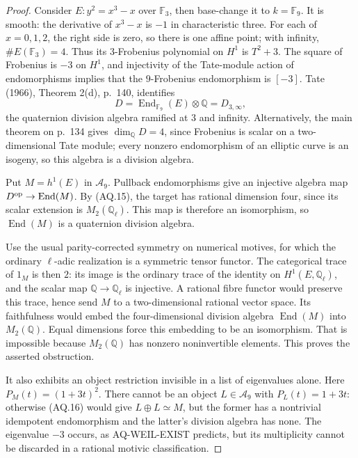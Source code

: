 \documentclass[11pt,a4paper]{article}
\theoremstyle{definition}\newtheorem{definition}[theorem]{Definition}
\theoremstyle{remark}\newtheorem{remark}[theorem]{Remark}
\begin{document}
\begin{proof}
Consider $E:y^2=x^3-x$ over $\mathbb F_3$, then
base-change it to $k=\mathbb F_9$. It is smooth:
the derivative of $x^3-x$ is $-1$ in characteristic
three. For each of $x=0,1,2$, the right side is
zero, so there is one affine point; with infinity,
$\#E(\mathbb F_3)=4$. Thus its $3$-Frobenius
polynomial on $H^1$ is $T^2+3$. The square of
Frobenius is $-3$ on $H^1$, and injectivity of
the Tate-module action of endomorphisms implies
that the $9$-Frobenius endomorphism is $[-3]$.
Tate (1966), Theorem 2(d), p.~140, identifies
\[
 D=\operatorname{End}_{\mathbb F_9}(E)\otimes\mathbb Q
   =D_{3,\infty},
\]
the quaternion division algebra ramified at $3$
and infinity. Alternatively, the main theorem
on p.~134 gives $\dim_{\mathbb Q}D=4$, since
Frobenius is scalar on a two-dimensional Tate
module; every nonzero endomorphism of an elliptic
curve is an isogeny, so this algebra is a division
algebra.

Put $M=h^1(E)$ in $\mathcal A_9$. Pullback
endomorphisms give an injective algebra map
$D^{\rm op}\to\operatorname{End}(M)$.
By (AQ.15), the target has rational dimension
four, since its scalar extension is
$M_2(\mathbb Q_\ell)$. This map is therefore
an isomorphism, so $\operatorname{End}(M)$ is
a quaternion division algebra.

Use the usual parity-corrected symmetry on
numerical motives, for which the ordinary
$\ell$-adic realization is a symmetric tensor
functor. The categorical trace of $1_M$ is
then $2$: its image is the ordinary trace of
the identity on $H^1(E,\mathbb Q_\ell)$,
and the scalar map $\mathbb Q\to\mathbb Q_\ell$
is injective. A rational fibre functor would
preserve this trace, hence send $M$ to a
two-dimensional rational vector space. Its
faithfulness would embed the four-dimensional
division algebra $\operatorname{End}(M)$ into
$M_2(\mathbb Q)$. Equal dimensions force this
embedding to be an isomorphism. That is
impossible because $M_2(\mathbb Q)$ has
nonzero noninvertible elements. This proves
the asserted obstruction.

It also exhibits an object restriction invisible
in a list of eigenvalues alone. Here
$P_M(t)=(1+3t)^2$. There cannot be an object
$L\in\mathcal A_9$ with $P_L(t)=1+3t$:
otherwise (AQ.16) would give $L\oplus L\simeq M$,
but the former has a nontrivial idempotent
endomorphism and the latter's division algebra
has none. The eigenvalue $-3$ occurs, as
AQ-WEIL-EXIST predicts, but its multiplicity
cannot be discarded in a rational motivic
classification.
\end{proof}
\end{document}
